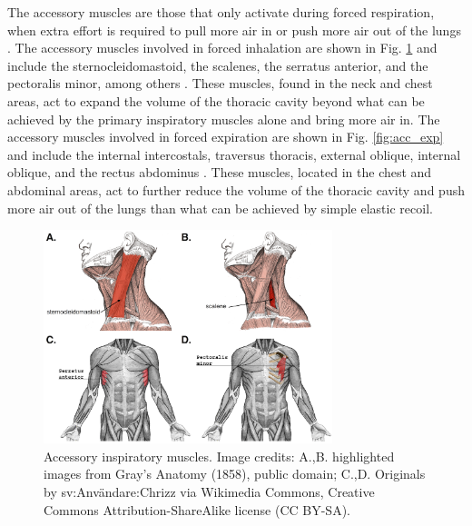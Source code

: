 \documentclass[12pt]{article}
\begin{document}
The accessory muscles are those that only activate during forced respiration, when extra effort is required to pull more air in or push more air out of the lungs \cite{openStax2016resp,sieck2013mechanical}. The accessory muscles involved in forced inhalation are shown in Fig. \ref{fig:acc_insp} and include the sternocleidomastoid, the scalenes, the serratus anterior, and the pectoralis minor, among others \cite{troyer1986action,ratnovsky2008mechanics}. These muscles, found in the neck and chest areas, act to expand the volume of the thoracic cavity beyond what can be achieved by the primary inspiratory muscles alone and bring more air in. The accessory muscles involved in forced expiration are shown in Fig. \ref{fig:acc_exp} and include the internal intercostals, traversus thoracis, external oblique, internal oblique, and the rectus abdominus \cite{troyer1986action,ratnovsky2008mechanics}. These muscles, located in the chest and abdominal areas, act to further reduce the volume of the thoracic cavity and push more air out of the lungs than what can be achieved by simple elastic recoil.

\begin{figure}[h!]
\centering
\includegraphics[width=0.75\textwidth]{images/accessory_insp.png}
\caption{Accessory inspiratory muscles. Image credits: A.,B. highlighted images from Gray's Anatomy (1858), public domain; C.,D. Originals by sv:Anv\"andare:Chrizz via Wikimedia Commons, Creative Commons Attribution-ShareAlike license (CC BY-SA).}
\label{fig:acc_insp}
\end{figure}%
\end{document}
